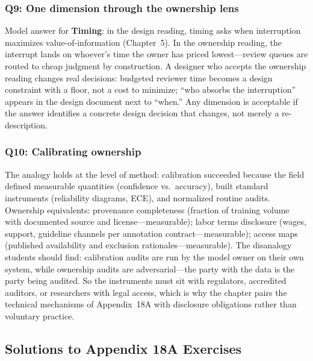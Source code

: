 \subsubsection*{Q9: One dimension through the ownership lens}

Model answer for \textbf{Timing}: in the design reading, timing asks when interruption maximizes value-of-information (Chapter~5). In the ownership reading, the interrupt lands on whoever's time the owner has priced lowest---review queues are routed to cheap judgment by construction. A designer who accepts the ownership reading changes real decisions: budgeted reviewer time becomes a design constraint with a floor, not a cost to minimize; ``who absorbs the interruption'' appears in the design document next to ``when.'' Any dimension is acceptable if the answer identifies a concrete design decision that changes, not merely a re-description.

\subsubsection*{Q10: Calibrating ownership}

The analogy holds at the level of method: calibration succeeded because the field defined measurable quantities (confidence vs.\ accuracy), built standard instruments (reliability diagrams, ECE), and normalized routine audits. Ownership equivalents: provenance completeness (fraction of training volume with documented source and license---measurable); labor terms disclosure (wages, support, guideline channels per annotation contract---measurable); access maps (published availability and exclusion rationales---measurable). The disanalogy students should find: calibration audits are run by the model owner on their own system, while ownership audits are adversarial---the party with the data is the party being audited. So the instruments must sit with regulators, accredited auditors, or researchers with legal access, which is why the chapter pairs the technical mechanisms of Appendix~18A with disclosure obligations rather than voluntary practice.

\subsection*{Solutions to Appendix 18A Exercises}

